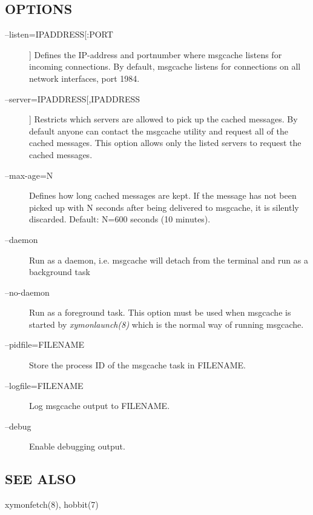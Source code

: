 \subsection{OPTIONS}
\begin{description}
\item[--listen=IPADDRESS[:PORT]] Defines the IP-address and portnumber where msgcache listens for incoming connections. By default, msgcache listens for connections on all network interfaces, port 1984. 

 

\item[--server=IPADDRESS[,IPADDRESS]] Restricts which servers are allowed to pick up the cached messages. By default anyone can contact the msgcache utility and request all of the cached messages. This option allows only the listed servers to request the cached messages. 

 

\item[--max-age=N] Defines how long cached messages are kept. If the message has not been picked up with N seconds after being delivered to msgcache, it is silently discarded. Default: N=600 seconds (10 minutes). 

 

\item[--daemon] Run as a daemon, i.e. msgcache will detach from the terminal and run as a background task 

 

\item[--no-daemon] Run as a foreground task. This option must be used when msgcache is started by \emph{xymonlaunch(8)}
 which is the normal way of running msgcache. 

 

\item[--pidfile=FILENAME] Store the process ID of the msgcache task in FILENAME. 

 

\item[--logfile=FILENAME] Log msgcache output to FILENAME. 

 

\item[--debug] Enable debugging output. 

 


\end{description}
\subsection{SEE ALSO}
xymonfetch(8), hobbit(7) 
  

